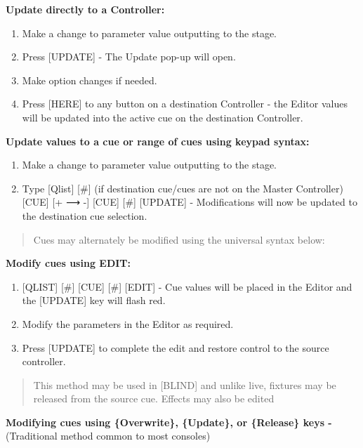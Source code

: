 \documentclass[
]{article}
\begin{document}
\textbf{Update directly to a Controller:}

\begin{enumerate}
\def\labelenumi{\arabic{enumi}.}
\item
  Make a change to parameter value outputting to the stage.
\item
  Press {[}UPDATE{]} - The Update pop-up will open.
\item
  Make option changes if needed.
\item
  Press {[}HERE{]} to any button on a destination Controller - the Editor values will be updated into the active cue on the destination Controller.
\end{enumerate}

\textbf{Update values to a cue or range of cues using keypad syntax:}

\begin{enumerate}
\def\labelenumi{\arabic{enumi}.}
\item
  Make a change to parameter value outputting to the stage.
\item
  Type {[}Qlist{]} {[}\#{]} (if destination cue/cues are not on the Master Controller) {[}CUE{]} {[}+ ⟶ -{]} {[}CUE{]} {[}\#{]} {[}UPDATE{]} - Modifications will now be updated to the destination cue selection.
\end{enumerate}

\begin{quote}
Cues may alternately be modified using the universal syntax below:
\end{quote}

\textbf{Modify cues using EDIT:}

\begin{enumerate}
\def\labelenumi{\arabic{enumi}.}
\item
  {[}QLIST{]} {[}\#{]} {[}CUE{]} {[}\#{]} {[}EDIT{]} - Cue values will be placed in the Editor and the {[}UPDATE{]} key will flash red.
\item
  Modify the parameters in the Editor as required.
\item
  Press {[}UPDATE{]} to complete the edit and restore control to the source controller.
\end{enumerate}

\begin{quote}
This method may be used in {[}BLIND{]} and unlike live, fixtures may be released from the source cue. Effects may also be edited
\end{quote}

\textbf{Modifying cues using \{Overwrite\}, \{Update\}, or \{Release\} keys -} (Traditional method common to most consoles)
\end{document}
